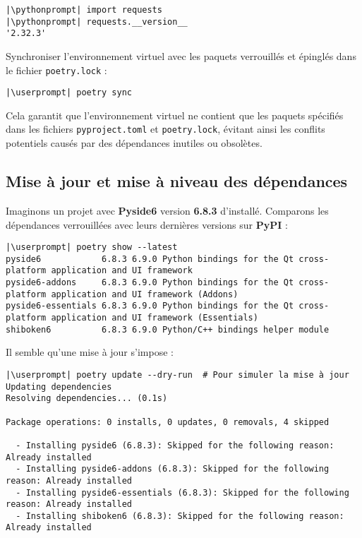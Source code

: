 \begin{lstlisting}[style=repl]
|\pythonprompt| import requests
|\pythonprompt| requests.__version__
'2.32.3'
\end{lstlisting}

Synchroniser l'environnement virtuel avec les paquets verrouillés et épinglés dans le fichier \texttt{poetry.lock} : 
\begin{lstlisting}[style=bash]
|\userprompt| poetry sync
\end{lstlisting}

Cela garantit que l'environnement virtuel ne contient que les paquets spécifiés dans les fichiers \texttt{pyproject.toml} et \texttt{poetry.lock}, évitant ainsi les conflits potentiels causés par des dépendances inutiles ou obsolètes.

\subsection*{Mise à jour et mise à niveau des dépendances}
Imaginons un projet avec \textbf{Pyside6} version \textbf{6.8.3} d'installé. Comparons les dépendances verrouillées avec leurs dernières versions sur \textbf{PyPI} :
\begin{lstlisting}[style=bash]
|\userprompt| poetry show --latest
pyside6            6.8.3 6.9.0 Python bindings for the Qt cross-platform application and UI framework
pyside6-addons     6.8.3 6.9.0 Python bindings for the Qt cross-platform application and UI framework (Addons)
pyside6-essentials 6.8.3 6.9.0 Python bindings for the Qt cross-platform application and UI framework (Essentials)
shiboken6          6.8.3 6.9.0 Python/C++ bindings helper module
\end{lstlisting}

Il semble qu'une mise à jour s'impose :
\begin{lstlisting}[style=bash]
|\userprompt| poetry update --dry-run  # Pour simuler la mise à jour
Updating dependencies
Resolving dependencies... (0.1s)

Package operations: 0 installs, 0 updates, 0 removals, 4 skipped

  - Installing pyside6 (6.8.3): Skipped for the following reason: Already installed
  - Installing pyside6-addons (6.8.3): Skipped for the following reason: Already installed
  - Installing pyside6-essentials (6.8.3): Skipped for the following reason: Already installed
  - Installing shiboken6 (6.8.3): Skipped for the following reason: Already installed
\end{lstlisting}

